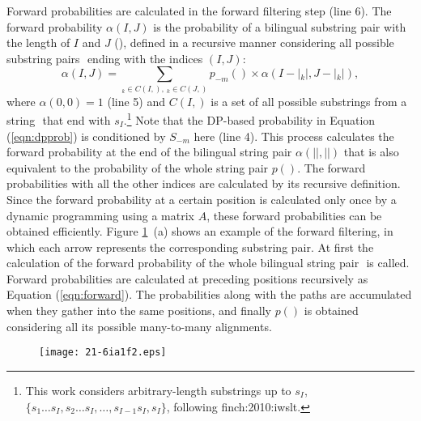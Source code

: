 \documentclass[english]{jnlp_1.4}
\makeatletter
\def\@{}
\def\pair#1#2{}
\def\subpair#1#2{}
\newcommand{\svec}[1]{}
\newcommand{\newcite}{}
\makeatother
\begin{document}
Forward probabilities are calculated in the forward filtering step (line 6).
The forward probability {$\alpha (I,J)$} is the probability of a bilingual substring pair 
with the length of $I$ and $J$ ({$\pair{s_1\ldots s_I}{t_1 \ldots t_J}$}),
defined in a recursive manner considering all possible substring pairs {$\subpair{\svec{\sigma}_{k}}{\svec{\tau}_{k}}$} ending with the indices {$(I,J)$}:
\begin{equation}
\alpha (I, J) = \sum_{\svec{\sigma}_{k} \in C(I,\svec{s}),\ \svec{\tau}_{k} \in C(J,\svec{t})} p_{-m} (\subpair{\svec{\sigma}_{k}}{\svec{\tau}_{k}}) \times \alpha (I-|\svec{\sigma}_{k}|, J-|\svec{\tau}_{k}|),
\label{eqn:forward}
\end{equation}
where {$\alpha (0,0) = 1$} (line 5) and {$C(I,\svec{s})$} is a set of all possible substrings
from a string {$\svec{s}$} that end with {$s_{I}$}.\footnote{
This work considers arbitrary-length substrings up to {$s_{I}$}, {$\{ s_{1}\ldots s_{I}, s_{2}\ldots s_{I},\ldots, s_{I-1}s_{I}, s_{I}\}$}, following {\newcite{finch:2010:iwslt}}.}\@ 
Note that the DP-based probability in Equation ({\ref{eqn:dpprob}}) is conditioned by {$S_{-m}$} here (line 4).
This process calculates the forward probability at the end of the bilingual string pair {$\alpha (|\svec{s}|, |\svec{t}|)$}
that is also equivalent to the probability of the whole string pair {$p (\pair{\svec{s}}{\svec{t}})$}.
The forward probabilities with all the other indices are calculated by its recursive definition.
Since the forward probability at a certain position is calculated only once by a dynamic programming using a matrix $A$,
these forward probabilities can be obtained efficiently.
Figure {\ref{fig:ffbs_org}}~(a) shows an example of the forward filtering,
in which each arrow represents the corresponding substring pair.
At first the calculation of the forward probability of the whole bilingual string pair {$\pair{\text{カバー}}{\mathit{cover}}$} is called.
Forward probabilities are calculated at preceding positions recursively as Equation ({\ref{eqn:forward}}).
The probabilities along with the paths are accumulated when they gather into the same positions,
and finally {$p(\pair{\text{カバー}}{\mathit{cover}})$} is obtained considering all its possible many-to-many alignments.

\begin{figure}[t]
\begin{center}
\texttt{[image: 21-6ia1f2.eps]}
\end{center}
\label{fig:ffbs_org}
\end{figure}
\end{document}
